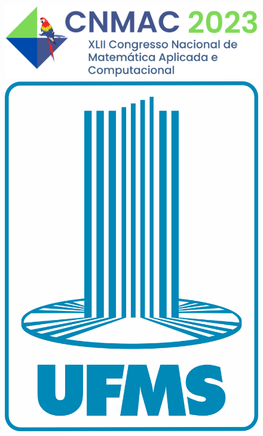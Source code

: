 \documentclass[a0,portrait]{a0poster}
\begin{document}
\onehalfspacing






\begin{figure}[!htb]
   \begin{minipage}{0.48\textwidth}
     \includegraphics[width=.7\linewidth]{LogoCNMAC2023-v2}
   \end{minipage}\hfill
   \begin{minipage}{0.48\textwidth}
	 \hspace{28cm}
     \includegraphics[width=.2\linewidth]{logo_ufms}
   \end{minipage}
\end{figure}
\end{document}
